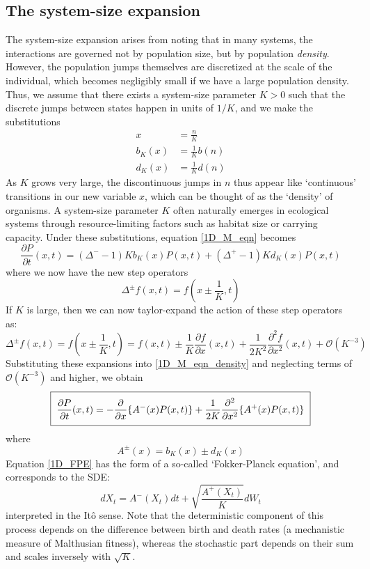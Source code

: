 \subsection{The system-size expansion}
The system-size expansion arises from noting that in many systems, the interactions are governed not by population size, but by population \emph{density}. However, the population jumps themselves are discretized at the scale of the individual, which becomes negligibly small if we have a large population density. Thus, we assume that there exists a system-size parameter $K > 0$ such that the discrete jumps between states happen in units of $1/K$, and we make the substitutions
\begin{align*}
x &= \frac{n}{K}\\
b_K(x) &= \frac{1}{K}b(n)\\
d_K(x) &= \frac{1}{K}d(n)
\end{align*}
As $K$ grows very large, the discontinuous jumps in $n$ thus appear like `continuous' transitions in our new variable $x$, which can be thought of as the `density' of organisms. A system-size parameter $K$ often naturally emerges in ecological systems through resource-limiting factors such as habitat size or carrying capacity. Under these substitutions, equation \eqref{1D_M_eqn} becomes
\begin{equation}
\label{1D_M_eqn_density}
\frac{\partial P}{\partial t}(x,t) = (\Delta^{-}-1)Kb_K(x)P(x,t) + (\Delta^{+}-1)Kd_K(x)P(x,t)
\end{equation}
where we now have the new step operators
\begin{equation}
\label{1D_step_operators_density}
\Delta^{\pm}f(x,t) = f\left(x\pm\frac{1}{K},t\right) 
\end{equation}
If $K$ is large, then we can now taylor-expand the action of these step operators as:
\begin{equation*}
\Delta^{\pm}f(x,t) = f\left(x\pm\frac{1}{K},t\right) = f(x,t) \pm \frac{1}{K}\frac{\partial f}{\partial x}(x,t) + \frac{1}{2K^2}\frac{\partial^2f}{\partial x^2}(x,t) + \mathcal{O}(K^{-3})
\end{equation*}
Substituting these expansions into \eqref{1D_M_eqn_density} and neglecting terms of $\mathcal{O}(K^{-3})$ and higher, we obtain
\begin{equation}
\label{1D_FPE}
\setlength{\fboxsep}{2\fboxsep}\boxed{
	\frac{\partial P}{\partial t}(x,t) = -\frac{ \partial}{\partial x}\{A^{-}(x)P(x,t)\} + \frac{1}{2K}\frac{\partial^2}{\partial x^2}\{A^{+}(x)P(x,t)\}
}
\end{equation}
where
\begin{equation*}
A^{\pm}(x) = b_K(x) \pm d_K(x)
\end{equation*}
Equation \eqref{1D_FPE} has the form of a so-called `Fokker-Planck equation', and corresponds to the SDE:
\begin{equation}
\label{1D_SDE}
dX_t = A^{-}(X_t)dt + \sqrt{\frac{A^{+}(X_t)}{K}}dW_t
\end{equation}
interpreted in the It\^{o} sense. Note that the deterministic component of this process depends on the difference between birth and death rates (a mechanistic measure of Malthusian fitness), whereas the stochastic part depends on their sum and scales inversely with $\sqrt{K}$.

